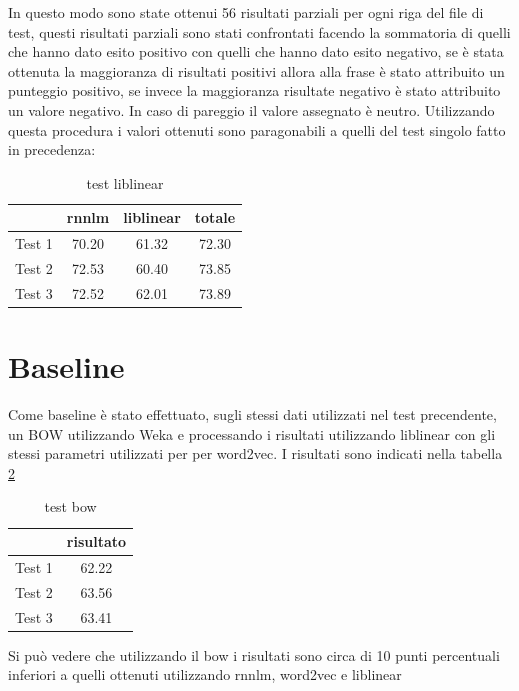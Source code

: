 \documentclass[a4paper,12pt,openright,twoside]{report}
\theoremstyle{definition}
\begin{document}
In questo modo sono state ottenui 56 risultati parziali per ogni riga del file di test, questi risultati parziali sono stati confrontati facendo la sommatoria di quelli che hanno dato esito positivo con quelli che hanno dato esito negativo, se è stata ottenuta la maggioranza di risultati positivi allora alla frase è stato attribuito un punteggio positivo, se invece la maggioranza risultate negativo è stato attribuito un valore negativo. In caso di pareggio il valore assegnato è neutro.
Utilizzando questa procedura i valori ottenuti sono paragonabili a quelli del  test singolo fatto in precedenza:
\begin{table}[h]
\begin{center}
\begin{tabular}{|c|c|c|c|}
\hline
& rnnlm & liblinear & totale \\
\hline
\hline
Test 1 & 70.20 & 61.32 & 72.30 \\
\hline
Test 2 & 72.53 & 60.40 & 73.85  \\
\hline
Test 3 & 72.52 & 62.01 & 73.89 \\
\hline
\end{tabular}
\end{center}
\caption{test liblinear}
\label{tab:test3}
\end{table}

\section{Baseline}
Come baseline è stato effettuato, sugli stessi dati utilizzati nel test precendente, un BOW utilizzando Weka e processando i risultati utilizzando liblinear con gli stessi parametri utilizzati per per word2vec. I risultati sono indicati nella tabella \ref{tab:baseTest1}
\begin{table}[h]
\begin{center}
\begin{tabular}{|c|c|}
\hline
& risultato  \\
\hline
\hline
Test 1 & 62.22 \\
\hline
Test 2 & 63.56 \\
\hline
Test 3 & 63.41 \\
\hline
\end{tabular}
\end{center}
\caption{test bow}
\label{tab:baseTest1}
\end{table}

Si può vedere che utilizzando il bow i risultati sono circa di 10 punti percentuali inferiori a quelli ottenuti utilizzando rnnlm, word2vec e liblinear
\end{document}
